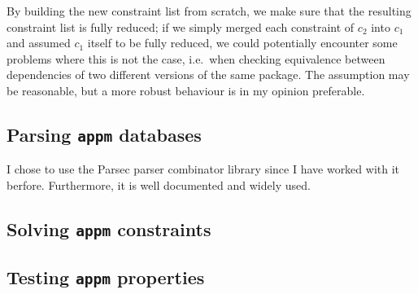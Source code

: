  By building the new constraint list from scratch, we make sure that the resulting constraint list is fully reduced; if we simply merged each constraint of $c_2$ into $c_1$ and assumed $c_1$ itself to be fully reduced, we could potentially encounter some problems where this is not the case, i.e.\ when checking equivalence between dependencies of two different versions of the same package. The assumption may be reasonable, but a more robust behaviour is in my opinion preferable.


\subsection*{Parsing \texttt{appm} databases}
I chose to use the Parsec parser combinator library since I have worked with it berfore. Furthermore, it is well documented and widely used.


\subsection*{Solving \texttt{appm} constraints}


\subsection*{Testing \texttt{appm} properties}
